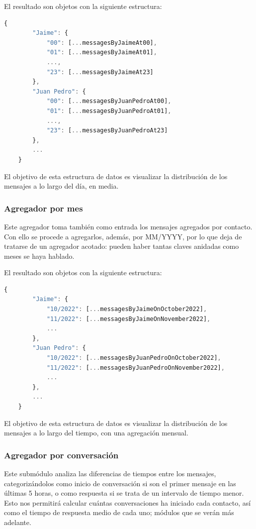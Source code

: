 El resultado son objetos con la siguiente estructura:

\begin{lstlisting}[language=JavaScript]
	{
		"Jaime": {
			"00": [...messagesByJaimeAt00],
			"01": [...messagesByJaimeAt01],
			...,
			"23": [...messagesByJaimeAt23]
		},
		"Juan Pedro": {
			"00": [...messagesByJuanPedroAt00],
			"01": [...messagesByJuanPedroAt01],
			...,
			"23": [...messagesByJuanPedroAt23]
		},
		...
	}
\end{lstlisting}

El objetivo de esta estructura de datos es visualizar la distribución de los mensajes a lo largo del día, en media.

\subsubsection{Agregador por mes}

Este agregador toma también como entrada los mensajes agregados por contacto. Con ello se procede a agregarlos, además, por MM/YYYY, por lo que deja de tratarse de un agregador acotado: pueden haber tantas claves anidadas como meses se haya hablado.

El resultado son objetos con la siguiente estructura:

\begin{lstlisting}[language=JavaScript]
	{
		"Jaime": {
			"10/2022": [...messagesByJaimeOnOctober2022],
			"11/2022": [...messagesByJaimeOnNovember2022],
			...
		},
		"Juan Pedro": {
			"10/2022": [...messagesByJuanPedroOnOctober2022],
			"11/2022": [...messagesByJuanPedroOnNovember2022],
			...
		},
		...
	}
\end{lstlisting}

El objetivo de esta estructura de datos es visualizar la distribución de los mensajes a lo largo del tiempo, con una agregación mensual.

\subsubsection{Agregador por conversación}

Este submódulo analiza las diferencias de tiempos entre los mensajes, categorizándolos como inicio de conversación si son el primer mensaje en las últimas 5 horas, o como respuesta si se trata de un intervalo de tiempo menor. Esto nos permitirá calcular cuántas conversaciones ha iniciado cada contacto, así como el tiempo de respuesta medio de cada uno; módulos que se verán más adelante.


